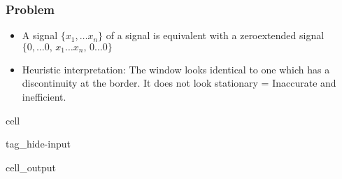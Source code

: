 \documentclass[letterpaper,10pt,english]{jupyterBook}
\begin{document}
\subsubsection{Problem}
\label{\detokenize{Representations/Short-time_analysis:problem}}\begin{itemize}
\item {} 
\sphinxAtStartPar
A signal \(\{x_1,\dots x_n\}\) of a signal is equivalent with a zero\sphinxhyphen{}extended signal \(\{0,\dots 0,\,x_1\dots x_n,\,0\dots0\}\)

\item {} 
\sphinxAtStartPar
Heuristic interpretation: The window looks identical to one which has a discontinuity at the border. It does not look stationary = Inaccurate and inefficient.

\end{itemize}

\begin{sphinxuseclass}{cell}
\begin{sphinxuseclass}{tag_hide-input}\begin{sphinxVerbatimOutput}

\begin{sphinxuseclass}{cell_output}
\noindent{}

\end{sphinxuseclass}\end{sphinxVerbatimOutput}

\end{sphinxuseclass}
\end{sphinxuseclass}
\end{document}
